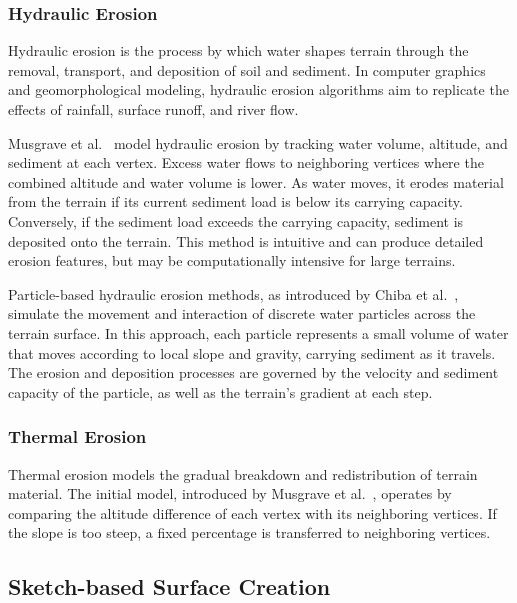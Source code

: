 \subsubsection{Hydraulic Erosion}

Hydraulic erosion is the process by which water shapes terrain through the removal, transport, and deposition of soil and sediment. In computer graphics and geomorphological modeling, hydraulic erosion algorithms aim to replicate the effects of rainfall, surface runoff, and river flow.

Musgrave et al.~\cite{musgrave1989synthesis} model hydraulic erosion by tracking water volume, altitude, and sediment at each vertex. Excess water flows to neighboring vertices where the combined altitude and water volume is lower. As water moves, it erodes material from the terrain if its current sediment load is below its carrying capacity. Conversely, if the sediment load exceeds the carrying capacity, sediment is deposited onto the terrain. This method is intuitive and can produce detailed erosion features, but may be computationally intensive for large terrains.

Particle-based hydraulic erosion methods, as introduced by Chiba et al.~\cite{chiba1998erosion}, simulate the movement and interaction of discrete water particles across the terrain surface. In this approach, each particle represents a small volume of water that moves according to local slope and gravity, carrying sediment as it travels. The erosion and deposition processes are governed by the velocity and sediment capacity of the particle, as well as the terrain's gradient at each step.

\subsubsection{Thermal Erosion}

Thermal erosion models the gradual breakdown and redistribution of terrain material. The initial model, introduced by Musgrave et al.~\cite{musgrave1989synthesis}, operates by comparing the altitude difference of each vertex with its neighboring vertices. If the slope is too steep, a fixed percentage is transferred to neighboring vertices.

\subsection{Sketch-based Surface Creation}
\label{subsec:sketch_based_surface_creation}

